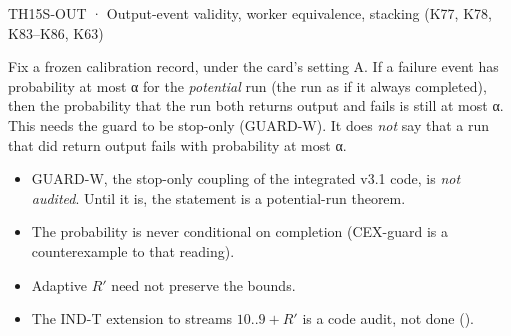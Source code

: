 \begin{card}{TH15}{S-OUT · Output-event validity, worker equivalence, stacking (K77, K78, K83–K86, K63)}
\begin{plain}
Fix a frozen calibration record, under the card's setting A. If a failure event has probability at most α for the \emph{potential} run (the run as if it always completed), then the probability that the run both returns output and fails is still at most α. This needs the guard to be stop-only (GUARD-W). It does \emph{not} say that a run that did return output fails with probability at most α.
\end{plain}
\begin{notproved}
\begin{itemize}
\item GUARD-W, the stop-only coupling of the integrated v3.1 code, is \emph{not audited}. Until it is, the statement is a potential-run theorem.
\item The probability is never conditional on completion (CEX-guard is a counterexample to that reading).
\item Adaptive $R'$ need not preserve the bounds.
\item The IND-T extension to streams $10..9+R'$ is a code audit, not done ().
\end{itemize}
\end{notproved}
\end{card}

